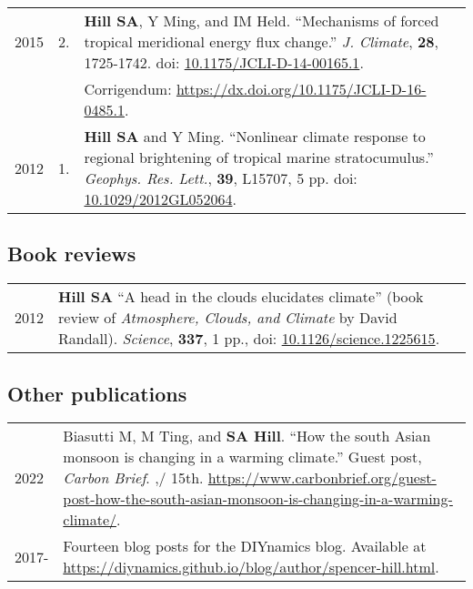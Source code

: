 \documentclass[letterpaper,11pt]{shillcv}
\begin{document}
\begin{longtable}{@{} Y{0.05\textwidth} >{\color{black}} p{0.04\textwidth} @{} L{0.91\textwidth} @{}}
2015 & 2. & \textbf{Hill SA}, Y Ming, and IM Held.  ``Mechanisms of forced
tropical meridional energy flux change.''  \emph{J. Climate}, \textbf{28}, 1725-1742.  doi: \href{http://dx.doi.org/10.1175/JCLI-D-14-00165.1}{10.1175/JCLI-D-14-00165.1}.\\
& & \hspace{1cm} Corrigendum: \href{https://dx.doi.org/10.1175/JCLI-D-16-0485.1}{https://dx.doi.org/10.1175/JCLI-D-16-0485.1}.\\
2012 & 1. & \textbf{Hill SA} and Y Ming.  ``Nonlinear climate response to regional
brightening of tropical marine stratocumulus.''  \emph{Geophys. Res. Lett.},
\textbf{39}, L15707, 5 pp.  doi: \href{http://dx.doi.org/10.1029/2012GL052064}{10.1029/2012GL052064}.\\
\end{longtable}

\subsection*{Book reviews}
\begin{longtable}{@{}  Y{0.05\textwidth} L{0.95\textwidth} @{}}
2012 & \textbf{Hill SA}  ``A head in the clouds elucidates climate'' (book
review of \emph{Atmosphere, Clouds, and Climate} by David Randall).  \emph{Science}, \textbf{337},
1 pp., doi: \href{http://dx.doi.org/10.1126/science.1225615}{10.1126/science.1225615}.\\
\end{longtable}

\subsection*{Other publications}
\begin{longtable}{@{}  Y{0.08\textwidth} L{0.92\textwidth} @{}}
2022 & Biasutti M, M Ting, and \textbf{SA Hill}.  ``How the south Asian monsoon is changing in a warming climate.''  Guest post, \emph{Carbon Brief}.  \sep/ 15th. \href{https://www.carbonbrief.org/guest-post-how-the-south-asian-monsoon-is-changing-in-a-warming-climate/}{https://www.carbonbrief.org/guest-post-how-the-south-asian-monsoon-is-changing-in-a-warming-climate/}.\\

2017- &  \raggedright Fourteen blog posts for the DIYnamics blog.  Available at \href{https://diynamics.github.io/blog/author/spencer-hill.html}{https://diynamics.github.io/blog/author/spencer-hill.html}.\\


\end{longtable}
\end{document}
